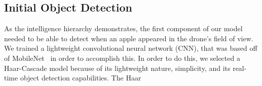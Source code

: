 \subsection{Initial Object Detection}
As the intelligence hierarchy demonstrates, the first component of our model needed to be able to detect when an apple appeared in the drone's field of view. 
We trained a lightweight convolutional neural network (CNN), that was based off of MobileNet~\cite{Sandler2018, } in order to accomplish this. 
In order to do this, we selected a Haar-Cascade model because of its lightweight nature, simplicity, and its real-time object detection capabilities. The Haar